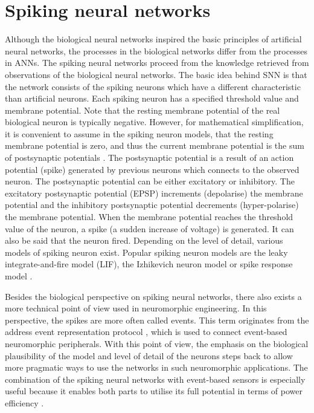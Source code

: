 \section{Spiking neural networks}
Although the biological neural networks inspired the basic principles of artificial neural networks, the processes in the biological networks differ from the processes in ANNs. The spiking neural networks proceed from the knowledge retrieved from observations of the biological neural networks. The basic idea behind SNN is that the network consists of the spiking neurons which have a different characteristic than artificial neurons. Each spiking neuron has a specified threshold value and membrane potential. Note that the resting membrane potential of the real biological neuron is typically negative. However, for mathematical simplification, it is convenient to assume in the spiking neuron models, that the resting membrane potential is zero, and thus the current membrane potential is the sum of postsynaptic potentials \cite{maassNetworksSpikingNeurons1997}. The postsynaptic potential is a result of an action potential (spike) generated by previous neurons which connects to the observed neuron. The postsynaptic potential can be either excitatory or inhibitory. The excitatory postsynaptic potential (EPSP) increments (depolarise) the membrane potential and the inhibitory postsynaptic potential decrements (hyper-polarise) the membrane potential. When the membrane potential reaches the threshold value of the neuron, a spike (a sudden increase of voltage) is generated. It can also be said that the neuron fired. Depending on the level of detail, various models of spiking neuron exist. Popular spiking neuron models are the leaky integrate-and-fire model (LIF), the Izhikevich neuron model or spike response model \cite{tavanaeiDeepLearningSpiking2019}. \par
Besides the biological perspective on spiking neural networks, there also exists a more technical point of view used in neuromorphic engineering. In this perspective, the spikes are more often called events. This term originates from the address event representation protocol \cite{pazTestInfrastructureAddressEventRepresentation2005, boahenPointtopointConnectivity00}, which is used to connect event-based neuromorphic peripherals. With this point of view, the emphasis on the biological plausibility of the model and level of detail of the neurons steps back to allow more pragmatic ways to use the networks in such neuromorphic applications. The combination of the spiking neural networks with event-based sensors is especially useful because it enables both parts to utilise its full potential in terms of power efficiency \cite{pfeifferDeepLearningSpiking2018}.

